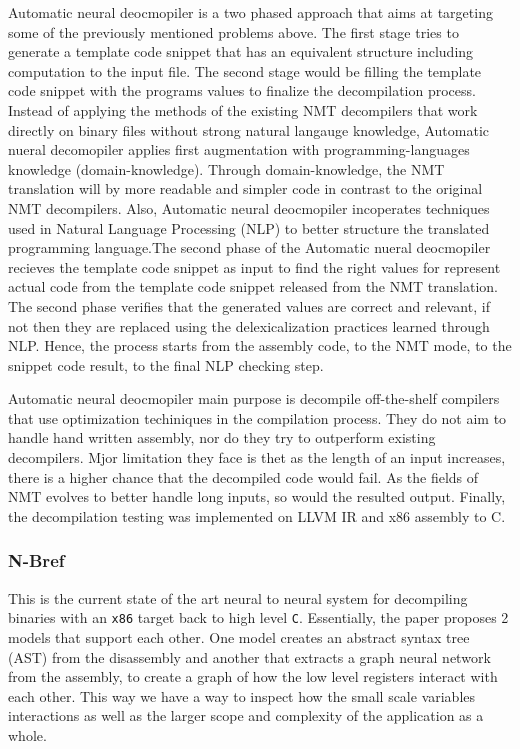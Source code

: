 \documentclass{article}
\begin{document}
Automatic neural deocmopiler is a two phased approach that aims at targeting some of the previously mentioned problems above. The first stage tries to generate a template code snippet that has an equivalent structure including computation to the input file. The second stage would be filling the template code snippet with the programs values to finalize the decompilation process.
Instead of applying the methods of the existing NMT decompilers that work directly on binary files without strong natural langauge knowledge, Automatic nueral decomopiler applies first augmentation with programming-languages knowledge (domain-knowledge). Through domain-knowledge, the NMT translation will by more readable and simpler code in contrast to the original NMT decompilers.
Also, Automatic neural deocmopiler incoperates techniques used in Natural Language Processing (NLP) to better structure the translated programming language.The second phase of the Automatic nueral deocmopiler recieves the template code snippet as input to find the right values for
represent actual code from the template code snippet released from the NMT translation. The second phase verifies that the generated values are correct and relevant, if not then they are replaced using the delexicalization practices learned through NLP. Hence, the process starts from the assembly code, to the NMT mode, to the snippet code result, to the final NLP checking step.

Automatic neural deocmopiler main purpose is decompile off-the-shelf compilers that use optimization techiniques in the compilation process. They do not aim to handle hand written assembly, nor do they try to outperform existing decompilers. Mjor limitation they face is thet as the length of an input
increases, there is a higher chance that the decompiled code would fail. As the fields of NMT evolves to better handle long inputs, so would the resulted output. Finally, the decompilation testing was implemented on LLVM IR
and x86 assembly to C.

\subsubsection{N-Bref}

This is the current state of the art neural to neural system for decompiling binaries with an \verb|x86| target back to high level \verb|C|.
Essentially, the paper proposes 2 models that support each other.
One model creates an abstract syntax tree (AST) from the disassembly and another that extracts a graph neural network from the assembly, to create a graph of how the low level registers interact with each other.
This way we have a way to inspect how the small scale variables interactions as well as the larger scope and complexity of the application as a whole.
\end{document}
